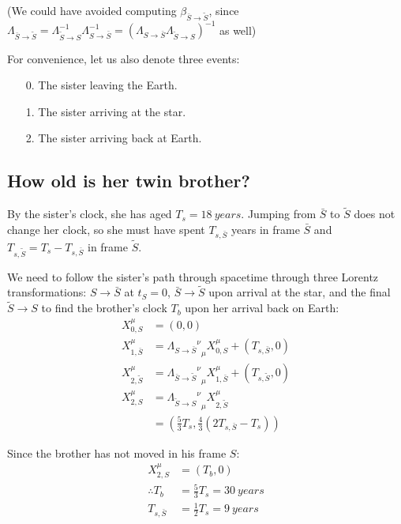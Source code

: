 \documentclass[a4paper]{scrartcl}
\begin{document}
(We could have avoided computing \(\beta_{\bar{S} \to \tilde{S}}\), since \(\Lambda_{\bar{S} \to \tilde{S}} = \Lambda_{\tilde{S} \to S}^{-1} \Lambda_{S \to \bar{S}}^{-1} = \left(\Lambda_{S \to \bar{S}} \Lambda_{\tilde{S} \to S}\right)^{-1}\) as well)

For convenience, let us also denote three events:
\begin{enumerate}
    \item[0.] The sister leaving the Earth.
    \item[1.] The sister arriving at the star.
    \item[2.] The sister arriving back at Earth.
\end{enumerate}

\subsection{How old is her twin brother?}
By the sister's clock, she has aged \(T_s = \SI{18}{years}\). Jumping from \(\bar{S}\) to \(\tilde{S}\) does not change her clock, so she must have spent \(T_{s, \bar{S}}\) years in frame \(\bar{S}\) and \(T_{s, \tilde{S}} = T_s - T_{s, \bar{S}}\) in frame \(\tilde{S}\).

We need to follow the sister's path through spacetime through three Lorentz transformations: \(S \to \bar{S}\) at \(t_S = 0\), \(\bar{S} \to \tilde{S}\) upon arrival at the star, and the final \(\tilde{S} \to S\) to find the brother's clock \(T_b\) upon her arrival back on Earth:
\begin{align*}
    X^\mu_{0, S} &= (0, 0) \\
    X^\mu_{1, \bar{S}} &= {{\Lambda_{S \to \bar{S}}}^\nu}_\mu X^\mu_{0, S} + (T_{s, \bar{S}}, 0) \\
    X^\mu_{2, \tilde{S}} &= {{\Lambda_{\bar{S} \to \tilde{S}}}^\nu}_\mu X^\mu_{1, \bar{S}} + (T_{s, \tilde{S}}, 0) \\
    X^\mu_{2, S} &= {{\Lambda_{\tilde{S} \to S}}^\nu}_\mu X^\mu_{2, \tilde{S}} \\
    &= \left(\frac{5}{3} T_s, \frac{4}{3} \left(2 T_{s, \bar{S}} - T_s\right)\right)
\end{align*}

Since the brother has not moved in his frame \(S\):
\begin{align*}
    X^\mu_{2, S} &= (T_b, 0) \\
    \therefore T_b &= \frac{5}{3} T_s = \SI{30}{years} \\
    T_{s, \bar{S}} &= \frac{1}{2} T_s = \SI{9}{years}
\end{align*}
\end{document}
